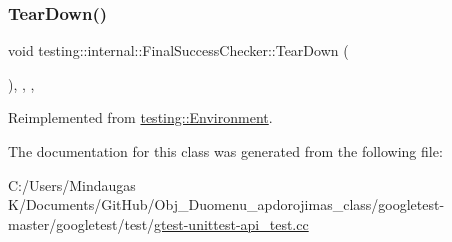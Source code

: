 \subsubsection{\texorpdfstring{TearDown()}{TearDown()}\hspace{0.1cm}{\footnotesize\ttfamily [3/3]}}
{\footnotesize\ttfamily void testing\+::internal\+::\+Final\+Success\+Checker\+::\+Tear\+Down (\begin{DoxyParamCaption}{ }\end{DoxyParamCaption})\hspace{0.3cm}{\ttfamily [inline]}, {\ttfamily [override]}, {\ttfamily [protected]}, {\ttfamily [virtual]}}



Reimplemented from \mbox{\hyperlink{classtesting_1_1_environment_a039bdaa705c46b9b88234cf4d3bb6254}{testing\+::\+Environment}}.



The documentation for this class was generated from the following file\+:\begin{DoxyCompactItemize}
\item 
C\+:/\+Users/\+Mindaugas K/\+Documents/\+Git\+Hub/\+Obj\+\_\+\+Duomenu\+\_\+apdorojimas\+\_\+class/googletest-\/master/googletest/test/\mbox{\hyperlink{googletest-master_2googletest_2test_2gtest-unittest-api__test_8cc}{gtest-\/unittest-\/api\+\_\+test.\+cc}}\end{DoxyCompactItemize}
